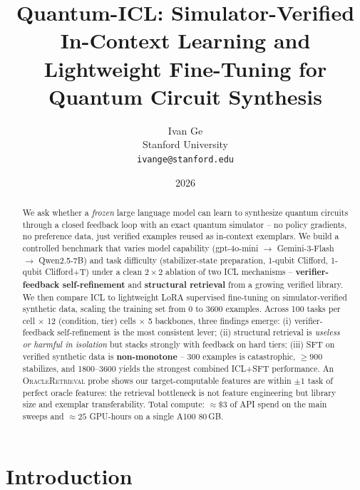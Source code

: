 \documentclass[11pt]{article}
\title{\textbf{Quantum-ICL: Simulator-Verified In-Context Learning and Lightweight Fine-Tuning for Quantum Circuit Synthesis}}
\author{Ivan Ge \\ \small Stanford University \\ \small \texttt{ivange@stanford.edu}}
\date{2026}
\begin{document}
\maketitle

\begin{abstract}
\noindent
We ask whether a \emph{frozen} large language model can learn to synthesize quantum circuits through a closed feedback loop with an exact quantum simulator -- no policy gradients, no preference data, just verified examples reused as in-context exemplars. We build a controlled benchmark that varies model capability (gpt-4o-mini $\to$ Gemini-3-Flash $\to$ Qwen2.5-7B) and task difficulty (stabilizer-state preparation, 1-qubit Clifford, 1-qubit Clifford+T) under a clean $2\times2$ ablation of two ICL mechanisms -- \textbf{verifier-feedback self-refinement} and \textbf{structural retrieval} from a growing verified library. We then compare ICL to lightweight LoRA supervised fine-tuning on simulator-verified synthetic data, scaling the training set from 0 to 3600 examples. Across 100 tasks per cell $\times$ 12 (condition, tier) cells $\times$ 5 backbones, three findings emerge: (i) verifier-feedback self-refinement is the most consistent lever; (ii) structural retrieval is \emph{useless or harmful in isolation} but stacks strongly with feedback on hard tiers; (iii) SFT on verified synthetic data is \textbf{non-monotone} -- 300 examples is catastrophic, $\geq900$ stabilizes, and 1800--3600 yields the strongest combined ICL+SFT performance. An \textsc{OracleRetrieval} probe shows our target-computable features are within $\pm1$ task of perfect oracle features: the retrieval bottleneck is not feature engineering but library size and exemplar transferability. Total compute: $\approx\$3$ of API spend on the main sweeps and $\approx25$ GPU-hours on a single A100 80\,GB.
\end{abstract}

\section{Introduction}
\end{document}
